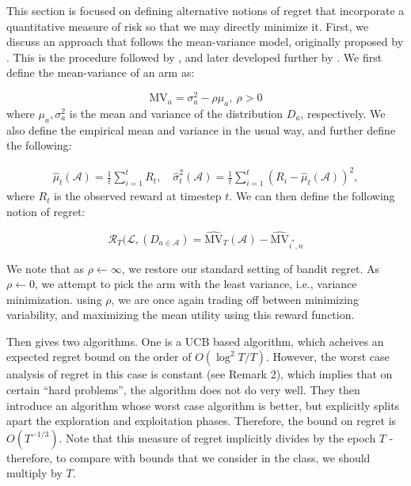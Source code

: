 \documentclass[11pt]{article}
\begin{document}
This section is focused on defining alternative notions of regret that incorporate a quantitative measure of risk so that we may directly minimize it. First, we discuss an approach that follows the mean-variance model, originally proposed by \cite{markowitz1952portfolio}. This is the procedure followed by \cite{sani2012risk}, and later developed further by \cite{vakili2016risk}. We first define the mean-variance of an arm as:

\begin{equation}
\mathrm{MV}_a = \sigma_a^2 - \rho \mu_a,~\rho > 0
\end{equation}
where $\mu_a, \sigma^2_a$ is the mean and variance of the distribution $D_a$, respectively. We also define the empirical mean and variance in the usual way, and further define the following:

\begin{align}
\hat \mu_{t}(\mathcal{A}) = \frac{1}{t} \sum_{i=1}^{t} R_t, \quad \hat \sigma^2_t(\mathcal{A}) = \frac{1}{t} \sum_{i=1}^{t}(R_i - \hat \mu_{t}(\mathcal{A}))^2,
\end{align}
where $R_t$ is the observed reward at timestep $t$. We can then define the following notion of regret:

\begin{equation}
\mathcal{R}_T(\mathcal{L}, (D_{a \in \mathcal{A}}) = \widehat{\mathrm{MV}}_T(\mathcal{A}) - \widehat{\mathrm{MV}}_{i^*, n}
\end{equation}

We note that as $\rho \leftarrow \infty$, we restore our standard setting of bandit regret. As $\rho \leftarrow 0$, we attempt to pick the arm with the least variance, i.e., variance minimization. using $\rho$, we are once again trading off between minimizing variability, and maximizing the mean utility using this reward function. 

\cite{sani2012risk} Then gives two algorithms. One is a UCB based algorithm, which acheives an expected regret bound on the order of $O(\log^2T/T)$. However, the worst case analysis of regret in this case is constant (see Remark 2), which implies that on certain ``hard problems'', the algorithm does not do very well. They then introduce an algorithm whose worst case algorithm is better, but explicitly splits apart the exploration and exploitation phases. Therefore, the bound on regret is $O(T^{-1/3})$. Note that this measure of regret implicitly divides by the epoch $T$ - therefore, to compare with bounds that we consider in the class, we should multiply by $T$.
\end{document}
